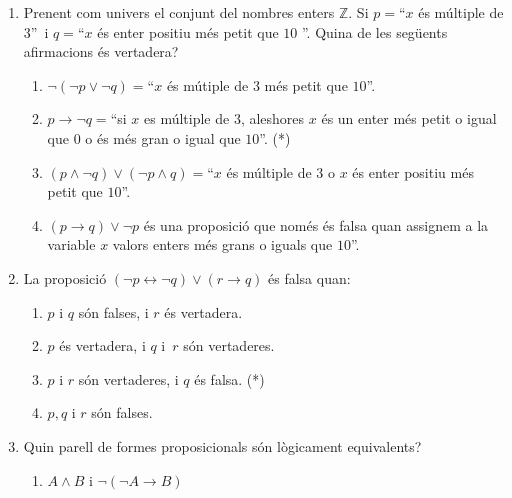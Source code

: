 \begin{enumerate}
\item Prenent com univers el conjunt del nombres enters $\mathbb{Z}$. Si
$p=$\textquotedblleft$x$ \'{e}s m\'{u}ltiple de $3$\textquotedblright\ i
$q=$\textquotedblleft$x$ \'{e}s enter positiu m\'{e}s petit que $10$%
\textquotedblright. Quina de les seg\"{u}ents afirmacions \'{e}s vertadera?

\begin{enumerate}
\item $\lnot\left(  \lnot p\vee\lnot q\right)  =$\textquotedblleft$x$ \'{e}s
m\'{u}tiple de $3$ m\'{e}s petit que $10$\textquotedblright.

\item $p\longrightarrow\lnot q=$\textquotedblleft si $x$ es m\'{u}ltiple de
$3$, aleshores $x$ \'{e}s un enter m\'{e}s petit o igual que $0$ o \'{e}s
m\'{e}s gran o igual que $10$\textquotedblright. (*)

\item $\left(  p\wedge\lnot q\right)  \vee\left(  \lnot p\wedge q\right)
=$\textquotedblleft$x$ \'{e}s m\'{u}ltiple de $3$ o $x$ \'{e}s enter positiu
m\'{e}s petit que $10$\textquotedblright.

\item $\left(  p\longrightarrow q\right)  \vee\lnot p$ \'{e}s una
proposici\'{o} que nom\'{e}s \'{e}s falsa quan assignem a la variable $x$
valors enters m\'{e}s grans o iguals que $10$\textquotedblright.
\end{enumerate}

\item La proposici\'{o} $\left(  \lnot p\longleftrightarrow\lnot q\right)
\vee\left(  r\longrightarrow q\right)  $ \'{e}s falsa quan:

\begin{enumerate}
\item $p$ i $q$ s\'{o}n falses, i $r$ \'{e}s vertadera.

\item $p$ \'{e}s vertadera, i $q$ i~$r$ s\'{o}n vertaderes.

\item $p$ i $r$ s\'{o}n vertaderes, i $q$ \'{e}s falsa. (*)

\item $p,q$ i $r$ s\'{o}n falses.
\end{enumerate}

\item Quin parell de formes proposicionals s\'{o}n l\`{o}gicament equivalents?

\begin{enumerate}
\item $A\wedge B$ i $\lnot\left(  \lnot A\longrightarrow B\right)  $


\end{enumerate}
\end{enumerate}
